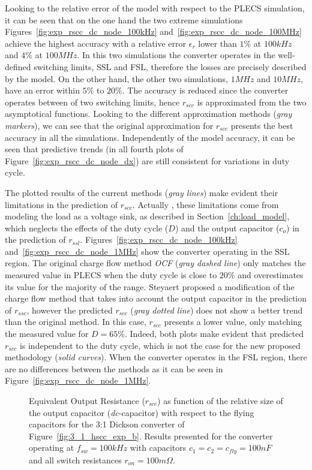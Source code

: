 Looking to the relative error  of the model with respect to the PLECS simulation, it can be seen that on the one hand the two extreme simulations Figures~\ref{fig:exp_rscc_dc_node_100kHz} and~\ref{fig:exp_rscc_dc_node_100MHz} achieve the highest accuracy with a relative error $\epsilon_r$ lower than $1\%$ at $100kHz$ and $4\%$ at $100MHz$. In this two simulations the converter operates in the well-defined switching limits, SSL and FSL, therefore the losses are precisely described by the model.  On the other hand, the other two simulations, $1MHz$ and $10MHz$,  have an error within $5\%$ to $20\%$. The accuracy is reduced since the converter operates between of two switching limits, hence $r_{scc}$ is approximated from the two asymptotical functions. Looking to the different approximation methods (\emph{gray markers}), we can see that the original approximation for $r_{scc}$ presents the best accuracy in all the simulations. Independently of the model accuracy, it can be seen that predictive trends (in all fourth plots of Figure~\ref{fig:exp_rscc_dc_node_dx}) are still consistent for variations in duty cycle.

The plotted results of the current methods (\emph{gray lines}) make evident their  limitations in the prediction of $r_{scc}$. Actually , these limitations come from modeling the load as a voltage sink, as described in Section~\ref{ch:load_model}, which neglects the effects of the duty cycle ($D$) and the output capacitor ($c_o$) in the prediction of $r_{ssl}$. Figures~\ref{fig:exp_rscc_dc_node_100kHz} and~\ref{fig:exp_rscc_dc_node_1MHz} show the converter operating in the SSL region. The original charge flow  method \emph{OCF} (\emph{gray dashed line}) only matches the measured value in PLECS when the duty cycle is close to $20\%$ and overestimates its value for the majority of the range. Steyaert proposed a modification of the charge flow method that takes into account the output capacitor in the prediction of $r_{ssc}$, however the predicted $r_{scc}$ (\emph{gray dotted line}) does not show a better trend than the original method. In this case, $r_{scc}$ presents a lower value, only matching the measured value for $D=65\%$. Indeed, both plots make evident that predicted $r_{scc}$ is independent to the duty cycle, which is not the case for the new proposed methodology (\emph{solid curves}).  When the converter operates in the FSL region, there are no differences between the methods as it can be seen in Figure~\ref{fig:exp_rscc_dc_node_1MHz}.

\begin{figure}[!h]
\newcommand\pHeigh{5cm}
\newcommand\pWidth{7cm}
\centering
     
     \caption{Equivalent Output Resistance ($r_{scc}$) as function of the relative size of the output capacitor (\emph{dc}-capacitor) with respect to the flying capacitors for the 3:1 Dickson converter of Figure~\ref{fig:3_1_hscc_exp_b}. Results presented for the converter operating at $f_{sw}=100kHz$ with capacitors $c_1=c_2=c_{fly}=100nF$ and all switch resistances $r_{on} = 100m\Omega$.}\label{fig:exp_rscc_pwm_node_fsw}
\end{figure}

